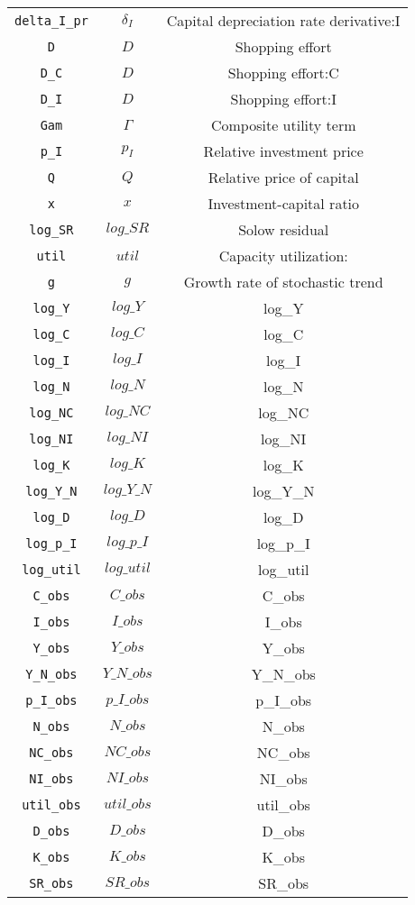 \begin{center}
\begin{longtable}{ccc}
\texttt{delta\_I\_pr} & ${\delta_I}$ & Capital depreciation rate derivative:I\\
\texttt{D} & ${D}$ & Shopping effort\\
\texttt{D\_C} & ${D}$ & Shopping effort:C\\
\texttt{D\_I} & ${D}$ & Shopping effort:I\\
\texttt{Gam} & ${\Gamma}$ & Composite utility term\\
\texttt{p\_I} & ${p_I}$ & Relative investment price\\
\texttt{Q} & ${Q}$ & Relative price of capital\\
\texttt{x} & ${x}$ & Investment-capital ratio\\
\texttt{log\_SR} & $log\_SR$ & Solow residual\\
\texttt{util} & ${util}$ & Capacity utilization:\\
\texttt{g} & ${g}$ & Growth rate of stochastic trend\\
\texttt{log\_Y} & $log\_Y$ & log\_Y\\
\texttt{log\_C} & $log\_C$ & log\_C\\
\texttt{log\_I} & $log\_I$ & log\_I\\
\texttt{log\_N} & $log\_N$ & log\_N\\
\texttt{log\_NC} & $log\_NC$ & log\_NC\\
\texttt{log\_NI} & $log\_NI$ & log\_NI\\
\texttt{log\_K} & $log\_K$ & log\_K\\
\texttt{log\_Y\_N} & $log\_Y\_N$ & log\_Y\_N\\
\texttt{log\_D} & $log\_D$ & log\_D\\
\texttt{log\_p\_I} & $log\_p\_I$ & log\_p\_I\\
\texttt{log\_util} & $log\_util$ & log\_util\\
\texttt{C\_obs} & $C\_obs$ & C\_obs\\
\texttt{I\_obs} & $I\_obs$ & I\_obs\\
\texttt{Y\_obs} & $Y\_obs$ & Y\_obs\\
\texttt{Y\_N\_obs} & $Y\_N\_obs$ & Y\_N\_obs\\
\texttt{p\_I\_obs} & $p\_I\_obs$ & p\_I\_obs\\
\texttt{N\_obs} & $N\_obs$ & N\_obs\\
\texttt{NC\_obs} & $NC\_obs$ & NC\_obs\\
\texttt{NI\_obs} & $NI\_obs$ & NI\_obs\\
\texttt{util\_obs} & $util\_obs$ & util\_obs\\
\texttt{D\_obs} & $D\_obs$ & D\_obs\\
\texttt{K\_obs} & $K\_obs$ & K\_obs\\
\texttt{SR\_obs} & $SR\_obs$ & SR\_obs\\
\hline%
\end{longtable}
\end{center}
